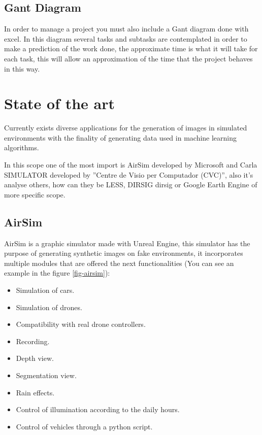 \documentclass[10pt,a4paper,twocolumn,twoside]{article}
\begin{document}
\subsection{Gant Diagram}

In order to manage a project you must also include a Gant diagram done with excel. In this diagram several tasks and subtasks are contemplated in order to make a prediction of the work done, the approximate time is what it will take for each task, this will allow an approximation of the time that the project behaves in this way.

\section{State of the art}
\label{estatart}

Currently exists diverse applications for the generation of images in simulated environments with the finality of generating data used in machine learning algorithms.

In this scope one of the most import is AirSim\cite{airsim} developed by Microsoft and Carla SIMULATOR\cite{carla} developed by ''Centre de Visio per Computador (CVC)'', also it's analyse others, how can they be LESS\cite{less}, DIRSIG {dirsig} or Google Earth Engine\cite{googleearth} of more specific scope.

\subsection{AirSim}
AirSim is a graphic simulator made with Unreal Engine, this simulator has the purpose of generating synthetic images on fake environments, it incorporates multiple modules that are offered the next functionalities (You can see an example in the figure \ref{fig-airsim}):

\begin{itemize}
  \item Simulation of cars.
  \item Simulation of drones.
  \item Compatibility with real drone controllers.
  \item Recording.
  \item Depth view.
  \item Segmentation view.
  \item Rain effects.
  \item Control of illumination according to the daily hours.
  \item Control of vehicles through a python script.
\end{itemize}
\end{document}
